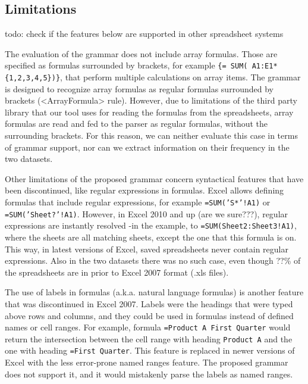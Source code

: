 \documentclass[conference]{IEEEtran}
\begin{document}
\subsection{Limitations}
todo: check if the features below are supported in other spreadsheet systems

The evaluation of the grammar does not include array formulas. Those are specified as formulas surrounded by brackets, for example \texttt{\{= SUM( A1:E1*\{1,2,3,4,5\})\}}, that perform multiple calculations on array items. The grammar is designed to recognize array formulas as regular formulas surrounded by brackets (<ArrayFormula> rule). However, due to limitations of the third party library that our tool uses for reading the formulas from the spreadsheets, array formulas are read and fed to the parser as regular formulas, without the surrounding brackets. For this reason, we can neither evaluate this case in terms of grammar support, nor can we extract information on their frequency in the two datasets.

Other limitations of the proposed grammar concern syntactical features that have been discontinued, like regular expressions in formulas. Excel allows defining formulas that include regular expressions, for example \texttt{=SUM('S*'!A1)} or \texttt{=SUM('Sheet?'!A1)}. However, in Excel 2010 and up (are we sure???), regular expressions are instantly resolved -in the example, to \texttt{=SUM(Sheet2:Sheet3!A1)}, where the sheets are all matching sheets, except the one that this formula is on. This way, in latest versions of Excel, saved spreadsheets never contain regular expressions. Also in the two datasets there was no such case, even though ??\% of the spreadsheets are in prior to Excel 2007 format (.xls files). 

The use of labels in formulas (a.k.a. natural language formulas) is another feature that was discontinued in Excel 2007. Labels were the headings that were typed above rows and columns, and they could be used in formulas instead of defined names or cell ranges. For example, formula \texttt{=Product A First Quarter} would return the intersection between the cell range with heading \texttt{Product A} and the one with heading \texttt{=First Quarter}. This feature is replaced in newer versions of Excel with the less error-prone named ranges feature. The proposed grammar does not support it, and it would mistakenly parse the labels as named ranges.
\end{document}
